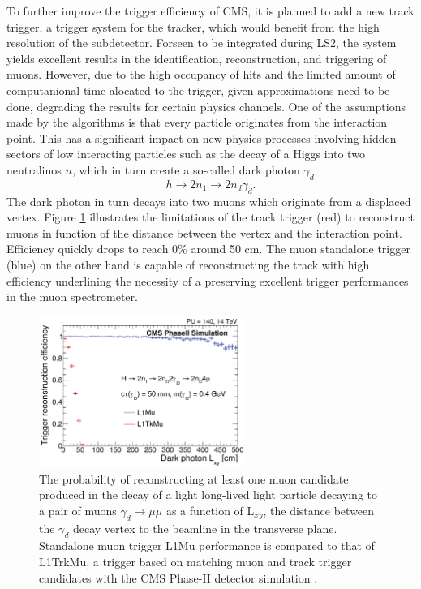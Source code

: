     To further improve the trigger efficiency of CMS, it is planned to add a new track trigger, a trigger system for the tracker, which would benefit from the high resolution of the subdetector. Forseen to be integrated during LS2, the system yields excellent results in the identification, reconstruction, and triggering of muons. However, due to the high occupancy of hits and the limited amount of computanional time alocated to the trigger, given approximations need to be done, degrading the results for certain physics channels. One of the assumptions made by the algorithms is that every particle originates from the interaction point. This has a significant impact on new physics processes involving hidden sectors of low interacting particles such as the decay of a Higgs into two neutralinos $ n $, which in turn create a so-called dark photon $ \gamma_d $
    \begin{equation}
      h \rightarrow 2 n_1 \rightarrow 2 n_d \gamma_d .
    \end{equation}
    The dark photon in turn decays into two muons which originate from a displaced vertex. Figure \ref{fig:II-1-dark-photon} illustrates the limitations of the track trigger (red) to reconstruct muons in function of the distance between the vertex and the interaction point. Efficiency quickly drops to reach 0\% around 50 cm. The muon standalone trigger (blue) on the other hand is capable of reconstructing the track with high efficiency underlining the necessity of a preserving excellent trigger performances in the muon spectrometer.

    \begin{figure}[h!]
      \centering
      \includegraphics[width=0.6\textwidth]{img/II-1-gem/dark-photon.pdf}
      \caption{The probability of reconstructing at least one muon candidate produced in the decay of a light long-lived light particle decaying to a pair of muons $\gamma_d \rightarrow \mu \mu $ as a function of L$_{xy}$, the distance between the $\gamma_d$ decay vertex to the beamline in the transverse plane. Standalone muon trigger L1Mu performance is compared to that of L1TrkMu, a trigger based on matching muon and track trigger candidates with the CMS Phase-II detector simulation \cite{Colaleo:2021453}.}
      \label{fig:II-1-dark-photon}
    \end{figure}

